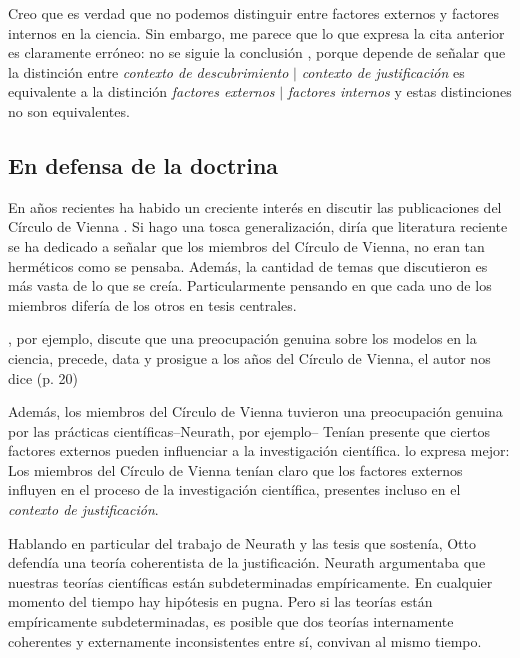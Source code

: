 Creo que es verdad que no podemos distinguir entre factores externos y factores internos en la ciencia.
Sin embargo, me parece que lo que expresa la cita anterior es claramente erróneo: no se siguie la conclusión , porque depende de señalar que la distinción entre  \emph{contexto de descubrimiento} $|$ \emph{contexto de justificación} es equivalente a la distinción \emph{factores externos} $|$ \emph{factores internos} y estas distinciones no son equivalentes.



\subsection{En defensa de la doctrina}

\noindent En años recientes ha habido un creciente interés en discutir las publicaciones del Círculo de Vienna \parencite{Bentley2023, Richardson2023, Suarez2024, Riel2014}.
Si hago una tosca generalización, diría que literatura reciente se ha dedicado a señalar que los miembros del Círculo de Vienna, no eran tan herméticos como se pensaba.
Además, la cantidad de temas que discutieron es más vasta de lo que se creía.
Particularmente pensando en que cada uno de los miembros difería de los otros en tesis centrales.

\textcite{Suarez2024}, por ejemplo, discute que una preocupación genuina sobre los modelos en la ciencia, precede, data y prosigue a los años del Círculo de Vienna, el autor nos dice  (p. 20)

Además, los miembros del Círculo de Vienna tuvieron una preocupación genuina por las prácticas científicas--Neurath, por ejemplo--
Tenían presente que ciertos factores externos pueden influenciar a la investigación científica.
\textcite[p. 24]{Bentley2023} lo expresa mejor: 
Los miembros del Círculo de Vienna tenían claro que los factores externos influyen en el proceso de la investigación científica, presentes incluso en el \emph{contexto de justificación}.

Hablando en particular del trabajo de Neurath y las tesis que sostenía, Otto defendía una teoría coherentista de la justificación.
Neurath argumentaba que nuestras teorías científicas están subdeterminadas empíricamente.
En cualquier momento del tiempo hay hipótesis en pugna.
Pero si las teorías están empíricamente subdeterminadas, es posible que dos teorías internamente coherentes y externamente inconsistentes entre sí, convivan al mismo tiempo.

